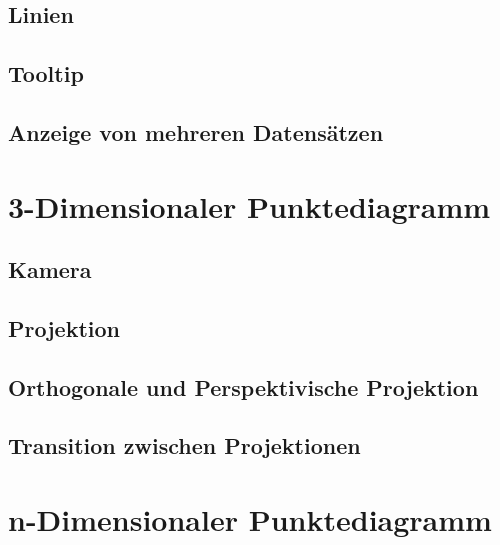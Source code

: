 \subsection{Linien}
\subsection{Tooltip}
\subsection{Anzeige von mehreren Datensätzen}

\section{3-Dimensionaler Punktediagramm}

\subsection{Kamera}
\subsection{Projektion}
\subsection{Orthogonale und Perspektivische Projektion}
\subsection{Transition zwischen Projektionen}

\section{n-Dimensionaler Punktediagramm}